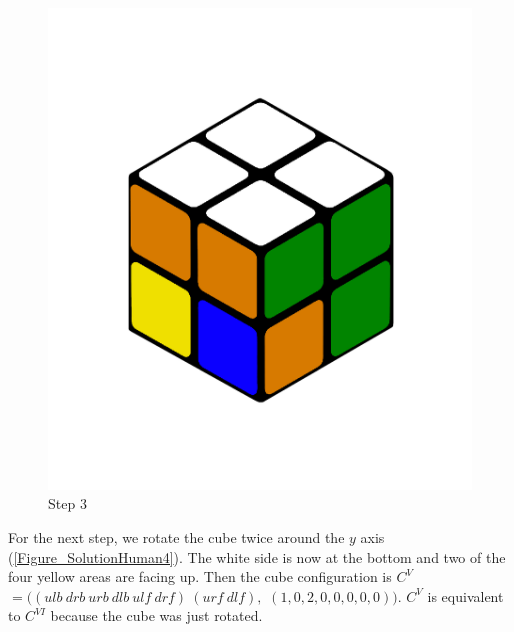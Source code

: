 \documentclass[12pt,a4paper]{article}
\theoremstyle{custom}
\begin{document}
\begin{figure}[H]
\centering
\includegraphics[scale=0.19]{Step3.png}
\caption{Step 3}
\label{Figure_SolutionHuman3}
\end{figure}

For the next step, we rotate the cube twice around the $y$ axis (\ref{Figure_SolutionHuman4}). The white side is now at the bottom and two of the four yellow areas are facing up. Then the cube configuration is $C^V $ $= (( \textit{ulb} \ \textit{drb} \ \textit{urb} \ \textit{dlb} \ \textit{ulf} \ \textit{drf} ) \ ( \textit{urf} \ \textit{dlf} ),$ $(1,0,2,0,0,0,0,0))$. $C^V$ is equivalent to $C^{VI}$ because the cube was just rotated.
\end{document}
